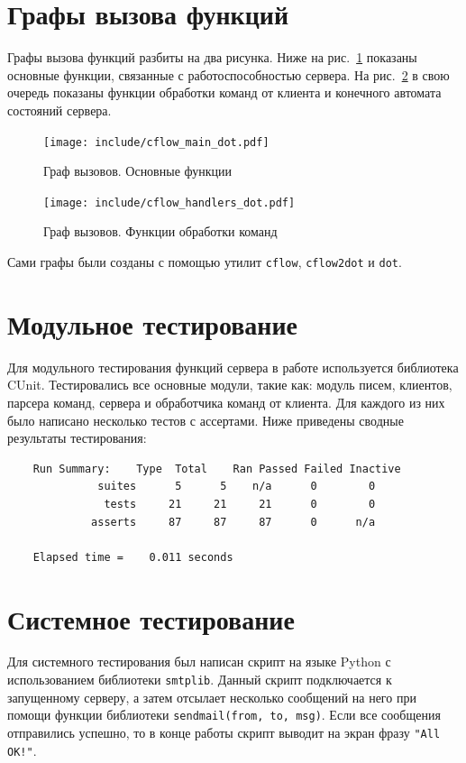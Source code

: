 \documentclass[a4paper,12pt]{report}
\begin{document}
\section{Графы вызова функций}

Графы вызова функций разбиты на два рисунка. Ниже на рис.~\ref{fig:cflow1} показаны основные функции, связанные с работоспособностью сервера. На рис.~\ref{fig:cflow2} в свою очередь показаны функции обработки команд от клиента и конечного автомата состояний сервера.

\begin{figure}[h]
\texttt{[image: include/cflow\_main\_dot.pdf]}
\caption{Граф вызовов. Основные функции}
\label{fig:cflow1}
\end{figure}

\begin{figure}
\centering
\texttt{[image: include/cflow\_handlers\_dot.pdf]}
\caption{Граф вызовов. Функции обработки команд}
\label{fig:cflow2}
\end{figure}

Сами графы были созданы с помощью утилит \texttt{cflow}, \texttt{cflow2dot} и \texttt{dot}.


\section{Модульное тестирование}

Для модульного тестирования функций сервера в работе используется библиотека CUnit. Тестировались все основные модули, такие как: модуль писем, клиентов, парсера команд, сервера и обработчика команд от клиента. Для каждого из них было написано несколько тестов с ассертами. Ниже приведены сводные результаты тестирования:
\begin{verbatim}
    Run Summary:    Type  Total    Ran Passed Failed Inactive
              suites      5      5    n/a      0        0
               tests     21     21     21      0        0
             asserts     87     87     87      0      n/a

    Elapsed time =    0.011 seconds
\end{verbatim}


\section{Системное тестирование}

Для системного тестирования был написан скрипт на языке Python с использованием библиотеки \texttt{smtplib}. Данный скрипт подключается к запущенному серверу, а затем отсылает несколько сообщений на него при помощи функции библиотеки \texttt{sendmail(from, to, msg)}. Если все сообщения отправились успешно, то в конце работы скрипт выводит на экран фразу \texttt{"All OK!"}.
\end{document}

